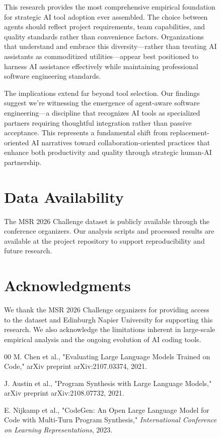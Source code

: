 \documentclass[conference]{IEEEtran}
\begin{document}
\begin{figure}[H]
This research provides the most comprehensive empirical foundation for strategic AI tool adoption ever assembled. The choice between agents should reflect project requirements, team capabilities, and quality standards rather than convenience factors. Organizations that understand and embrace this diversity—rather than treating AI assistants as commoditized utilities—appear best positioned to harness AI assistance effectively while maintaining professional software engineering standards.

The implications extend far beyond tool selection. Our findings suggest we're witnessing the emergence of agent-aware software engineering—a discipline that recognizes AI tools as specialized partners requiring thoughtful integration rather than passive acceptance. This represents a fundamental shift from replacement-oriented AI narratives toward collaboration-oriented practices that enhance both productivity and quality through strategic human-AI partnership.

\section*{Data Availability}

The MSR 2026 Challenge dataset is publicly available through the conference organizers. Our analysis scripts and processed results are available at the project repository to support reproducibility and future research.

\section*{Acknowledgments}

We thank the MSR 2026 Challenge organizers for providing access to the dataset and Edinburgh Napier University for supporting this research. We also acknowledge the limitations inherent in large-scale empirical analysis and the ongoing evolution of AI coding tools.

\balance
\begin{thebibliography}{00}
 M. Chen et al., "Evaluating Large Language Models Trained on Code," arXiv preprint arXiv:2107.03374, 2021.

 J. Austin et al., "Program Synthesis with Large Language Models," arXiv preprint arXiv:2108.07732, 2021.

 E. Nijkamp et al., "CodeGen: An Open Large Language Model for Code with Multi-Turn Program Synthesis," \textit{International Conference on Learning Representations}, 2023.


\end{thebibliography}
\end{figure}
\end{document}
